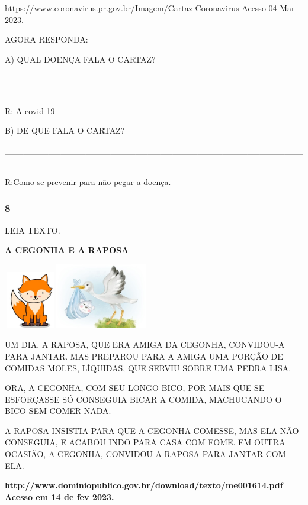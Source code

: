\url{https://www.coronavirus.pr.gov.br/Imagem/Cartaz-Coronavirus} Acesso
04 Mar 2023.

AGORA RESPONDA:

A) QUAL DOENÇA FALA O CARTAZ?

\_\_\_\_\_\_\_\_\_\_\_\_\_\_\_\_\_\_\_\_\_\_\_\_\_\_\_\_\_\_\_\_\_\_\_\_\_\_\_\_\_\_\_\_\_\_\_\_\_\_\_\_\_\_\_\_\_\_\_\_\_\_\_\_\_\_\_\_\_\_\_\_\_\_

R: A covid 19

B) DE QUE FALA O CARTAZ?

\_\_\_\_\_\_\_\_\_\_\_\_\_\_\_\_\_\_\_\_\_\_\_\_\_\_\_\_\_\_\_\_\_\_\_\_\_\_\_\_\_\_\_\_\_\_\_\_\_\_\_\_\_\_\_\_\_\_\_\_\_\_\_\_\_\_\_\_\_\_\_\_\_\_

R:Como se prevenir para não pegar a doença.

\subsubsection{8 }\label{section-62}

LEIA TEXTO.

\textbf{A CEGONHA E A RAPOSA}

\includegraphics[width=0.90625in,height=0.98597in]{media/image121.jpeg}\includegraphics[width=1.57292in,height=1.12292in]{media/image122.jpeg}

UM DIA, A RAPOSA, QUE ERA AMIGA DA CEGONHA, CONVIDOU-A PARA JANTAR. MAS
PREPAROU PARA A AMIGA UMA PORÇÃO DE COMIDAS MOLES, LÍQUIDAS, QUE SERVIU
SOBRE UMA PEDRA LISA.

ORA, A CEGONHA, COM SEU LONGO BICO, POR MAIS QUE SE ESFORÇASSE SÓ
CONSEGUIA BICAR A COMIDA, MACHUCANDO O BICO SEM COMER NADA.

A RAPOSA INSISTIA PARA QUE A CEGONHA COMESSE, MAS ELA NÃO CONSEGUIA, E
ACABOU INDO PARA CASA COM FOME. EM OUTRA OCASIÃO, A CEGONHA, CONVIDOU A
RAPOSA PARA JANTAR COM ELA.

\textbf{http://www.dominiopublico.gov.br/download/texto/me001614.pdf
Acesso em 14 de fev 2023.}

